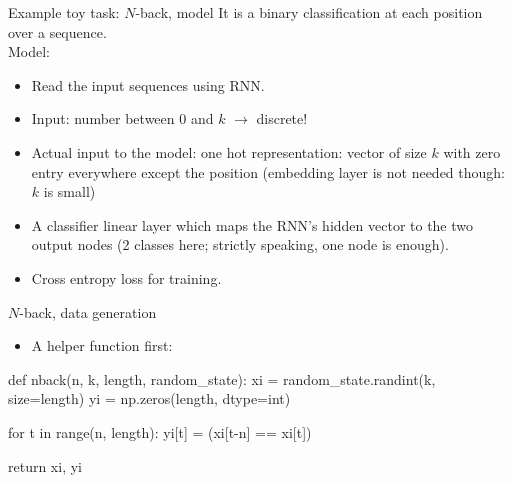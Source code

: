 \begin{frame}[fragile]{Example toy task: $N$-back, model}
It is a binary classification at each position over a sequence.\\
Model:
\begin{itemize}
\item Read the input sequences using RNN.
\item Input: number between 0 and $k$ $\rightarrow$ discrete!
\item Actual input to the model: one hot representation: vector of size $k$
with zero entry everywhere except the position (embedding layer is not needed though: $k$ is small)
\item A classifier linear layer which maps the RNN's hidden vector to the
two output nodes (2 classes here; strictly speaking, one node is enough).
\item Cross entropy loss for training.
\end{itemize}
\end{frame}

%

\begin{frame}[fragile]{$N$-back, data generation}
\begin{itemize}
\item A helper function first:
\end{itemize}
\begin{python}
def nback(n, k, length, random_state):
  xi = random_state.randint(k, size=length)
  yi = np.zeros(length, dtype=int)

  for t in range(n, length):
    yi[t] = (xi[t-n] == xi[t])

  return xi, yi
\end{python}

\end{frame}

